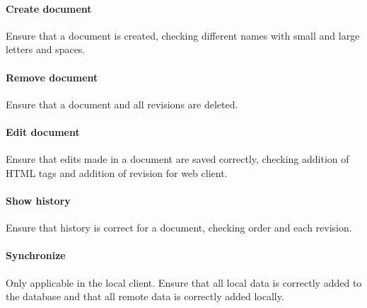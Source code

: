 	\paragraph{Create document}
	Ensure that a document is created, checking different names with small and large letters and spaces.

	\paragraph{Remove document}
	Ensure that a document and all revisions are deleted.

	\paragraph{Edit document}
	Ensure that edits made in a document are saved correctly, checking addition of HTML tags and addition of revision for web client.

	\paragraph{Show history}
	Ensure that history is correct for a document, checking order and each revision.

	\paragraph{Synchronize}
	Only applicable in the local client. Ensure that all local data is correctly added to the database and that all remote data is correctly added locally.
